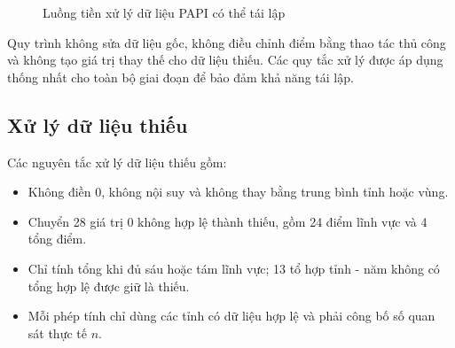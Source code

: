 \begin{figure}[H]
    \centering
    \caption{Luồng tiền xử lý dữ liệu PAPI có thể tái lập}
    \label{fig:data-pipeline}
\end{figure}

Quy trình không sửa dữ liệu gốc, không điều chỉnh điểm bằng thao tác thủ công và không tạo giá trị thay thế cho dữ liệu thiếu. Các quy tắc xử lý được áp dụng thống nhất cho toàn bộ giai đoạn để bảo đảm khả năng tái lập.

\subsection{Xử lý dữ liệu thiếu}

Các nguyên tắc xử lý dữ liệu thiếu gồm:

\begin{itemize}
    \setlength{\itemsep}{0.2em}
    \setlength{\parskip}{0pt}
    \item Không điền 0, không nội suy và không thay bằng trung bình tỉnh hoặc vùng.
    \item Chuyển 28 giá trị 0 không hợp lệ thành thiếu, gồm 24 điểm lĩnh vực và 4 tổng điểm.
    \item Chỉ tính tổng khi đủ sáu hoặc tám lĩnh vực; 13 tổ hợp tỉnh - năm không có tổng hợp lệ được giữ là thiếu.
    \item Mỗi phép tính chỉ dùng các tỉnh có dữ liệu hợp lệ và phải công bố số quan sát thực tế $n$.
\end{itemize}

